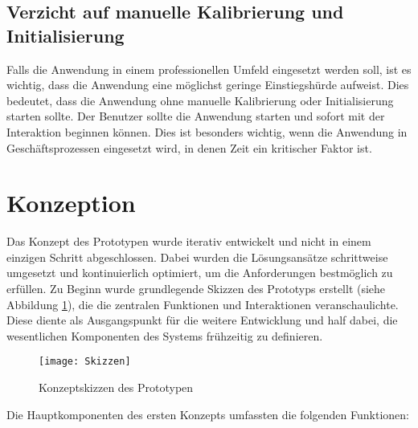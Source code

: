 \subsection{Verzicht auf manuelle Kalibrierung und Initialisierung}

Falls die Anwendung in einem professionellen Umfeld eingesetzt werden soll, ist es wichtig, dass die Anwendung eine möglichst geringe Einstiegshürde aufweist. Dies bedeutet, dass die Anwendung ohne manuelle Kalibrierung oder Initialisierung starten sollte. Der Benutzer sollte die Anwendung starten und sofort mit der Interaktion beginnen können. Dies ist besonders wichtig, wenn die Anwendung in Geschäftsprozessen eingesetzt wird, in denen Zeit ein kritischer Faktor ist.

\section{Konzeption}

Das Konzept des Prototypen wurde iterativ entwickelt und nicht in einem einzigen Schritt abgeschlossen. Dabei wurden die Lösungsansätze schrittweise umgesetzt und kontinuierlich optimiert, um die Anforderungen bestmöglich zu erfüllen. Zu Beginn wurde grundlegende Skizzen des Prototyps erstellt (siehe Abbildung \ref{fig:Concept}), die die zentralen Funktionen und Interaktionen veranschaulichte. Diese diente als Ausgangspunkt für die weitere Entwicklung und half dabei, die wesentlichen Komponenten des Systems frühzeitig zu definieren.

\begin{figure}[ht]
    \centering
    \texttt{[image: Skizzen]}
    \caption{Konzeptskizzen des Prototypen}
    \label{fig:Concept}
\end{figure}

Die Hauptkomponenten des ersten Konzepts umfassten die folgenden Funktionen:

